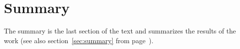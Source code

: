 %
%

\chapter{Summary}

The summary is the last section of the text and summarizes the results of the 
work (see also section~\ref{sec:summary} from page~\pageref{sec:summary}).

